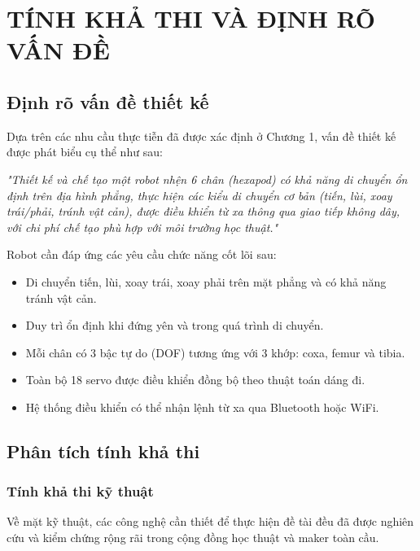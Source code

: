 \chapter{TÍNH KHẢ THI VÀ ĐỊNH RÕ VẤN ĐỀ}
    \section{Định rõ vấn đề thiết kế}

        \hspace{0.5cm} Dựa trên các nhu cầu thực tiễn đã được xác định ở Chương 1, vấn đề thiết kế được phát biểu cụ thể như sau:

        \textit{"Thiết kế và chế tạo một robot nhện 6 chân (hexapod) có khả năng di chuyển ổn định trên địa hình phẳng, thực hiện các kiểu di chuyển cơ bản (tiến, lùi, xoay trái/phải, tránh vật cản), được điều khiển từ xa thông qua giao tiếp không dây, với chi phí chế tạo phù hợp với môi trường học thuật."}

        Robot cần đáp ứng các yêu cầu chức năng cốt lõi sau:

        \begin{itemize}
            \item Di chuyển tiến, lùi, xoay trái, xoay phải trên mặt phẳng và có khả năng tránh vật cản.
            \item Duy trì ổn định khi đứng yên và trong quá trình di chuyển.
            \item Mỗi chân có 3 bậc tự do (DOF) tương ứng với 3 khớp: coxa, femur và tibia.
            \item Toàn bộ 18 servo được điều khiển đồng bộ theo thuật toán dáng đi.
            \item Hệ thống điều khiển có thể nhận lệnh từ xa qua Bluetooth hoặc WiFi.
        \end{itemize}

    \section{Phân tích tính khả thi}

        \subsection{Tính khả thi kỹ thuật}

        \hspace{0.5cm} Về mặt kỹ thuật, các công nghệ cần thiết để thực hiện đề tài đều đã được nghiên cứu và kiểm chứng rộng rãi trong cộng đồng học thuật và maker toàn cầu.

